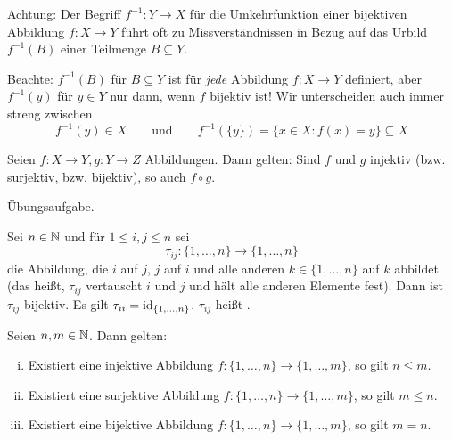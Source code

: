 Achtung: Der Begriff $f^{-1} \colon Y \rightarrow X$ für die Umkehrfunktion einer bijektiven Abbildung $f \colon X \rightarrow Y$ führt oft zu Missverständnissen in Bezug auf das Urbild $f^{-1}(B)$ einer Teilmenge $B \subseteq Y$.

Beachte: $f^{-1}(B)$ für $B \subseteq Y$ ist für \textit{jede} Abbildung $f \colon X \rightarrow Y$ definiert, aber $f^{-1}(y)$ für $y \in Y$ nur dann, wenn $f$ bijektiv ist!
Wir unterscheiden auch immer streng zwischen 
\[
	f^{-1}(y) \in X \qquad \text{und} \qquad f^{-1}(\{y\}) = \{x \in X : f(x) = y\} \subseteq X
\]

\begin{lemma}
	\label{lemma:I.2.14}
	Seien $f \colon X \rightarrow Y, g \colon Y \rightarrow Z$ Abbildungen.
	Dann gelten:
	Sind $f$ und $g$ injektiv (bzw. surjektiv, bzw. bijektiv), so auch $f \circ g$.
\end{lemma}

\begin{beweis}
	Übungsaufgabe.
	\qedhere
\end{beweis}

\begin{beispiel}[Transpositionsabbildung]
	\label{bsp:I.2.15}
	Sei $n \in \mathbb{N}$ und für $1 \leq i,j \leq n$ sei
	\[
		\tau_{ij}\colon \{1,\dots,n\} \rightarrow \{1,\dots,n\}
	\]
	die Abbildung, die $i$ auf $j$, $j$ auf $i$ und alle anderen $k \in \{1,\dots,n\}$ auf $k$ abbildet (das heißt, $\tau_{ij}$ vertauscht $i$ und $j$ und hält alle anderen Elemente fest).
	Dann ist $\tau_{ij}$ bijektiv.
	Es gilt $\tau_{ii} = \operatorname{id}_{\{1,\dots,n\}}$.
	$\tau_{ij}$ heißt .
\end{beispiel}

\begin{lemma}
	\label{lemma:I.2.16}
	Seien $n,m \in \mathbb{N}$.
	Dann gelten:
	\begin{enumerate}[(i)]
		\item Existiert eine injektive Abbildung $f \colon \{1,\dots,n\} \rightarrow \{1,\dots,m\}$, so gilt $n \leq m$.
		\item Existiert eine surjektive Abbildung $f \colon \{1,\dots,n\} \rightarrow \{1,\dots,m\}$, so gilt $m \leq n$.
		\item Existiert eine bijektive Abbildung $f \colon \{1,\dots,n\} \rightarrow \{1,\dots,m\}$, so gilt $m = n$.
	\end{enumerate}
\end{lemma}

